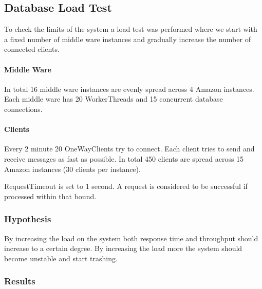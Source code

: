 \documentclass[milestone1.tex]{subfiles}
\begin{document}


\subsection{Database Load Test}
To check the limits of the system a load test was performed where we start with a fixed number of middle ware instances and gradually increase the number of connected clients.

\paragraph{Middle Ware}
In total 16 middle ware instances are evenly spread across 4 Amazon instances. Each middle ware has 20 WorkerThreads and 15 concurrent database connections.

\paragraph{Clients}
Every 2 minute 20 OneWayClients try to connect. Each client tries to send and receive messages as fast as possible. In total 450 clients are spread across 15 Amazon instances (30 clients per instance).

RequestTimeout is set to 1 second. A request is considered to be successful if processed within that bound. 

\subsubsection{Hypothesis}

By increasing the load on the system both response time and throughput should increase to a certain degree. By increasing the load more the system should become unstable and start trashing.

\subsubsection{Results}
\end{document}
